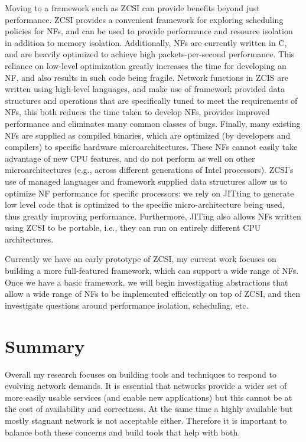 \documentclass[letterpaper]{article}
\begin{document}
Moving to a framework such as ZCSI can provide benefits beyond just performance. ZCSI provides a convenient framework
for exploring scheduling policies for NFs, and can be used to provide performance and resource isolation in addition to
memory isolation. Additionally, NFs are currently written in C, and are heavily optimized to achieve high
packets-per-second performance. This reliance on low-level optimization greatly increases the time for developing an NF,
and also results in such code being fragile. Network functions in ZCIS are written using high-level languages, and make use of
framework provided data structures and operations that are specifically tuned to meet the requirements of NFs, this
both reduces the time taken to develop NFs, provides improved performance and eliminates many common classes of bugs.
Finally, many existing NFs are supplied as compiled binaries, which are optimized (by developers and compilers) to
specific hardware microarchitectures. These NFs cannot easily take advantage of new CPU features, and do not perform as
well on other microarchitectures (e.g., across different generations of Intel processors). ZCSI's use of managed
languages and framework supplied data structures allow us to optimize NF performance for specific processors: we rely on
JITting to generate low level code that is optimized to the specific micro-architecture being used, thus greatly
improving performance. Furthermore, JITing also allows NFs written using ZCSI to be portable, i.e., they can run on
entirely different CPU architectures. 

Currently we have an early prototype of ZCSI, my current work focuses on building a more full-featured framework, which
can support a wide range of NFs. Once we have a basic framework, we will begin investigating abstractions that allow a
wide range of NFs to be implemented efficiently on top of ZCSI, and then investigate questions around performance
isolation, scheduling, etc.

\section*{Summary}
Overall my research focuses on building tools and techniques to respond to evolving network demands. It is essential
that networks provide a wider set of more easily usable services (and enable new applications) but this cannot be at the
cost of availability and correctness. At the same time a highly available but mostly stagnant network is not acceptable
either. Therefore it is important to balance both these concerns and build tools that help with both.


\end{document}
